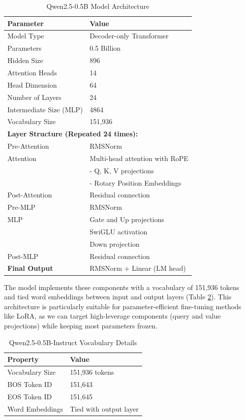 \documentclass{article}
\begin{document}
\begin{table}[ht]
\centering
\begin{tabular}{ll}
\hline
\textbf{Parameter} & \textbf{Value} \\
\hline
Model Type & Decoder-only Transformer \\
Parameters & 0.5 Billion \\
Hidden Size & 896 \\
Attention Heads & 14 \\
Head Dimension & 64 \\
Number of Layers & 24 \\
Intermediate Size (MLP) & 4864 \\
Vocabulary Size & 151,936 \\
\hline
\multicolumn{2}{l}{\textbf{Layer Structure (Repeated 24 times):}} \\
\hline
Pre-Attention & RMSNorm \\
Attention & Multi-head attention with RoPE \\
& \quad - Q, K, V projections \\
& \quad - Rotary Position Embeddings \\
Post-Attention & Residual connection \\
Pre-MLP & RMSNorm \\
MLP & Gate and Up projections \\
& SwiGLU activation \\
& Down projection \\
Post-MLP & Residual connection \\
\hline
\textbf{Final Output} & RMSNorm + Linear (LM head) \\
\hline
\end{tabular}
\caption{Qwen2.5-0.5B Model Architecture}
\label{tab:qwen25-overview} 
\end{table}


The model implements these components with a vocabulary of 151,936 tokens and tied word embeddings between input and output layers (Table \ref{tab:qwen25-vocab}). This architecture is particularly suitable for parameter-efficient fine-tuning methods like LoRA, as we can target high-leverage components (query and value projections) while keeping most parameters frozen.

\begin{table}[H]
\centering
\begin{tabular}{@{}ll@{}}
\hline
\textbf{Property} & \textbf{Value} \\
\hline
Vocabulary Size & 151,936 tokens \\
BOS Token ID & 151,643 \\
EOS Token ID & 151,645 \\
Word Embeddings & Tied with output layer \\
\hline
\end{tabular}
\caption{Qwen2.5-0.5B-Instruct Vocabulary Details}
\label{tab:qwen25-vocab}
\end{table}
\end{document}

